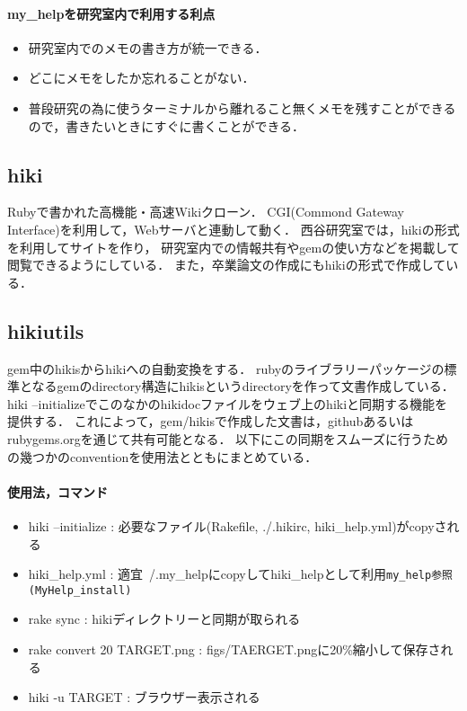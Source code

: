 \paragraph{my\_helpを研究室内で利用する利点}
\begin{itemize}
\item 研究室内でのメモの書き方が統一できる．
\item どこにメモをしたか忘れることがない．
\item 普段研究の為に使うターミナルから離れること無くメモを残すことができるので，書きたいときにすぐに書くことができる．
\end{itemize}

\subsection{hiki}
Rubyで書かれた高機能・高速Wikiクローン\cite{d}．
CGI(Commond Gateway Interface)を利用して，Webサーバと連動して動く\cite{e}．
西谷研究室では，hikiの形式を利用してサイトを作り，
研究室内での情報共有やgemの使い方などを掲載して閲覧できるようにしている．
また，卒業論文の作成にもhikiの形式で作成している．

\subsection{hikiutils}
gem中のhikisからhikiへの自動変換をする．
rubyのライブラリーパッケージの標準となるgemのdirectory構造にhikisというdirectoryを作って文書作成している．hiki --initializeでこのなかのhikidocファイルをウェブ上のhikiと同期する機能を提供する．
これによって，gem/hikisで作成した文書は，githubあるいはrubygems.orgを通じて共有可能となる．
以下にこの同期をスムーズに行うための幾つかのconventionを使用法とともにまとめている．

\paragraph{使用法，コマンド}
\begin{itemize}
\item hiki --initialize : 必要なファイル(Rakefile, ./.hikirc, hiki\_help.yml)がcopyされる
\item hiki\_help.yml : 適宜~/.my\_helpにcopyしてhiki\_helpとして利用\verb|my_help参照(MyHelp_install)|
\item rake sync : hikiディレクトリーと同期が取られる
\item rake convert 20 TARGET.png : figs/TAERGET.pngに20\%縮小して保存される
\item hiki -u TARGET : ブラウザー表示される
\end{itemize}

